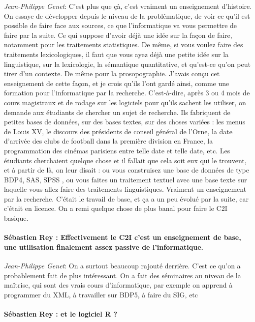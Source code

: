 \noindent\emph{Jean-Philippe Genet}: C'est plus que çà, c'est vraiment un enseignement d'histoire. On essaye de développer depuis le niveau de la problématique, de voir ce qu'il est possible de faire face aux sources, ce que l'informatique va vous permettre de faire par la suite. Ce qui suppose d'avoir déjà une idée sur la façon de faire, notamment pour les traitements statistiques. De même, si vous voulez faire des traitements lexicologiques, il faut que vous ayez déjà une petite idée sur la linguistique, sur la lexicologie, la sémantique quantitative, et qu'est-ce qu'on peut tirer d'un contexte. De même pour la prosopographie. J'avais conçu cet enseignement de cette façon, et je crois qu'ils l'ont gardé ainsi, comme une formation pour l'informatique par la recherche. C'est-à-dire, après 3 ou 4 mois de cours magistraux et de rodage sur les logiciels pour qu'ils sachent les utiliser, on demande aux étudiants de chercher un sujet de recherche. Ils fabriquent de petites bases de données, sur des bases textes, sur des choses variées : les menus de Louis XV, le discours des présidents de conseil général de l'Orne, la date d'arrivée des clubs de football dans la première division en France, la programmation des cinémas parisiens entre telle date et telle date, etc. Les étudiants cherchaient quelque chose et il fallait que cela soit eux qui le trouvent, et à partir de là, on leur disait : ou vous construisez une base de données de type BDP4, SAS, SPSS , ou vous faites un traitement textuel avec une base texte sur laquelle vous allez faire des traitements linguistiques. Vraiment un enseignement par la recherche. C'était le travail de base, et ça a un peu évolué par la suite, car c'était en licence. On a remi quelque chose de plus banal pour faire le C2I basique.

\paragraph*{Sébastien Rey : Effectivement le C2I c'est un enseignement de base, une utilisation finalement assez passive de l'informatique.}

\noindent\emph{Jean-Philippe Genet}: On a surtout beaucoup rajouté derrière. C'est ce qu'on a probablement fait de plus intéressant. On a fait des séminaires au niveau de la maîtrise, qui sont des vrais cours d'informatique, par exemple on apprend à programmer du XML, à travailler sur BDP5, à faire du SIG, etc

\paragraph*{Sébastien Rey : et le logiciel R ?}


